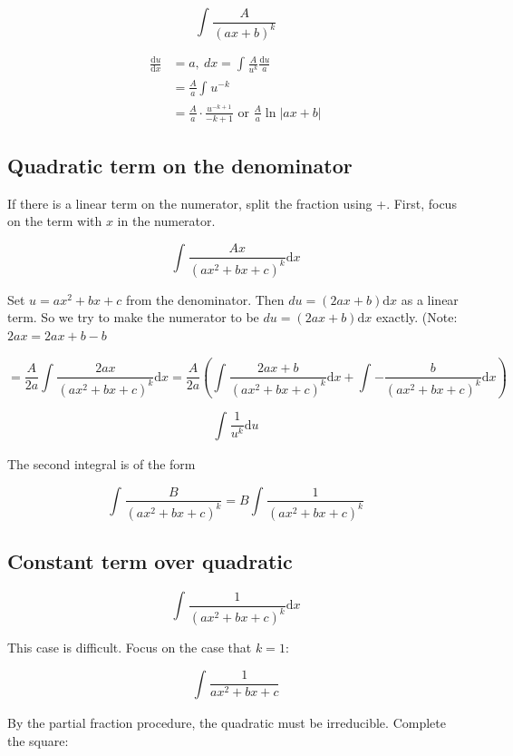 \documentclass[12pt]{article}
\theoremstyle{plain}
\theoremstyle{remark}
\theoremstyle{definition}
\begin{document}
\[\int_{}^{}\frac{A}{(ax + b)^{k}}\]

\begin{align*}
\frac{\text{d}u}{\text{d}x} &= a,\ dx = \int_{}^{}{\frac{A}{u^{k}}\frac{\text{d}u}{a}} \\
&= \frac{A}{a}\int_{}^{}u^{- k} \\
&= \frac{A}{a} \cdot \frac{u^{- k + 1}}{- k + 1}\text{\ or\ }\frac{A}{a}\ln|ax + b|
\end{align*}



\subsection{Quadratic term on the
denominator}

If there is a linear term on the numerator, split the fraction using +.
First, focus on the term with \(x\) in the numerator.

\[\int_{}^{}{\frac{Ax}{\left( ax^{2} + bx + c \right)^{k}}\text{d}x}\]

Set \(u = ax^{2} + bx + c\) from the denominator. Then
\(du = (2ax + b)\text{d}x\) as a linear term. So we try to make the
numerator to be \(du = (2ax + b)\text{d}x\) exactly. (Note:
\(2ax = 2ax + b - b\)

\[{= \frac{A}{2a}\int_{}^{}{\frac{2ax}{\left( ax^{2} + bx + c \right)^{k}}\text{d}x} }{= \frac{A}{2a}\left( \int_{}^{}{\frac{2ax + b}{\left( ax^{2} + bx + c \right)^{k}}\text{d}x} + \int_{}^{}{- \frac{b}{\left( ax^{2} + bx + c \right)^{k}}\text{d}x} \right)} \]

\[\int_{}^{}{\frac{1}{u^{k}}\text{d}u}\]

The second integral is of the form

\[\int_{}^{}\frac{B}{\left( ax^{2} + bx + c \right)^{k}} = B\int_{}^{}\frac{1}{\left( ax^{2} + bx + c \right)^{k}}\]


\subsection{Constant term over
quadratic}

\[\int_{}^{}{\frac{1}{\left( ax^{2} + bx + c \right)^{k}}\text{d}x}\]

This case is difficult. Focus on the case that \(k = 1\):

\[\int_{}^{}\frac{1}{ax^{2} + bx + c}\]

By the partial fraction procedure, the quadratic must be irreducible.
Complete the square:
\end{document}
